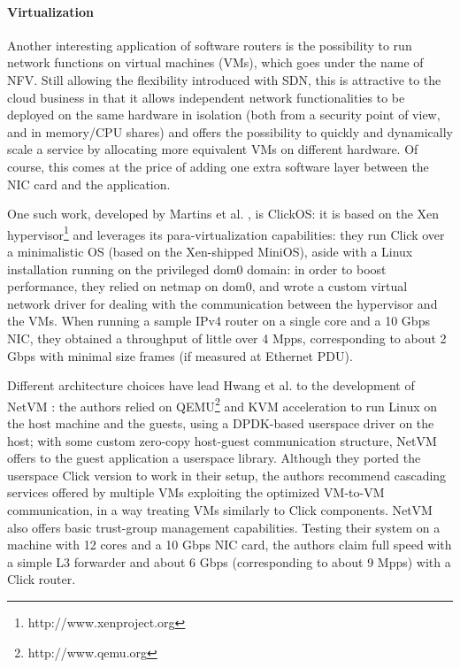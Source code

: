\documentclass[11pt,a4paper,twoside,titlepage,openany]{book}
\begin{document}
\paragraph{Virtualization} Another interesting application of software routers is the possibility to run network functions on virtual machines (VMs), which goes under the name of \acrfull{NFV}.
Still allowing the flexibility introduced with \gls{SDN}, this is attractive to the cloud business in that it allows independent network functionalities to be deployed on the same hardware in isolation (both from a security point of view, and in memory/CPU shares) and offers the possibility to quickly and dynamically scale a service by allocating more equivalent VMs on different hardware. Of course, this comes at the price of adding one extra software layer between the NIC card and the application.

One such work, developed by Martins et al. \cite{clickos}, is ClickOS: it is based on the Xen hypervisor\footnote{http://www.xenproject.org} and leverages its para-virtualization capabilities: they run Click over a minimalistic OS (based on the Xen-shipped MiniOS), aside with a Linux installation running on the privileged dom0 domain: in order to boost performance, they relied on netmap \cite{netmap} on dom0, and wrote a custom virtual network driver for dealing with the communication between the hypervisor and the VMs. When running a sample IPv4 router on a single core and a 10 Gbps NIC, they obtained a throughput of little over 4 Mpps, corresponding to about 2 Gbps with minimal size frames (if measured at Ethernet \gls{PDU}).

Different architecture choices have lead Hwang et al. to the development of NetVM \cite{netvm}: the authors relied on QEMU\footnote{http://www.qemu.org} and KVM acceleration to run Linux on the host machine and the guests, using a DPDK-based userspace driver on the host; with some custom zero-copy host-guest communication structure, NetVM offers to the guest application a userspace library. Although they ported the userspace Click version to work in their setup, the authors recommend cascading services offered by multiple VMs exploiting the optimized VM-to-VM communication, in a way treating VMs similarly to Click components. NetVM also offers basic trust-group management capabilities. Testing their system on a machine with 12 cores and a 10 Gbps NIC card, the authors claim full speed with a simple L3 forwarder and about 6 Gbps (corresponding to about 9 \gls{Mpps}) with a Click router.
\end{document}
